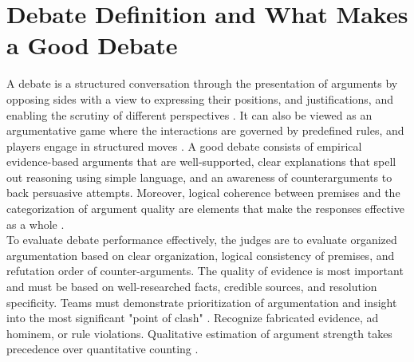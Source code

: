\documentclass[conference]{IEEEtran}
\begin{document}
\section{Debate Definition and What Makes a Good Debate}
A debate is a structured conversation through the presentation of arguments by opposing sides with a view to expressing their positions, and justifications, and enabling the scrutiny of different perspectives \cite{b1}\cite{b2}. It can also be viewed as an argumentative game where the interactions are governed by predefined rules, and players engage in structured moves \cite{b6}. A good debate consists of empirical evidence-based arguments that are well-supported, clear explanations that spell out reasoning using simple language, and an awareness of counterarguments to back persuasive attempts. Moreover, logical coherence between premises and the categorization of argument quality are elements that make the responses effective as a whole \cite{b6}. \\
To evaluate debate performance effectively, the judges are to evaluate organized argumentation based on clear organization, logical consistency of premises, and refutation order of counter-arguments. The quality of evidence is most important and must be based on well-researched facts, credible sources, and resolution specificity. Teams must demonstrate prioritization of argumentation and insight into the most significant "point of clash" \cite{b8}. Recognize fabricated evidence, ad hominem, or rule violations. Qualitative estimation of argument strength takes precedence over quantitative counting \cite{b7}\cite{b8}.
\end{document}
